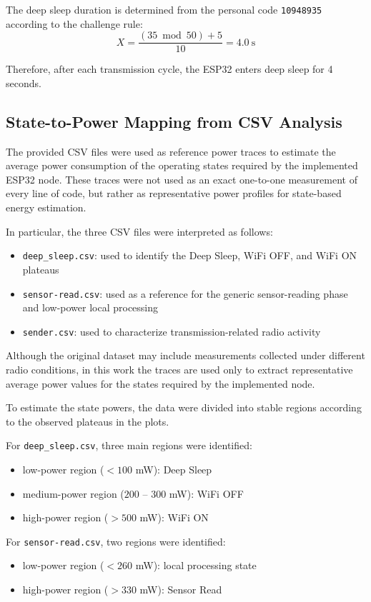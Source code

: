 \documentclass{article}
\begin{document}
The deep sleep duration is determined from the personal code \texttt{10948935} according to the challenge rule:
\[
X=\frac{(35 \bmod 50)+5}{10}=4.0\ \text{s}
\]

Therefore, after each transmission cycle, the ESP32 enters deep sleep for 4 seconds.

\subsection{State-to-Power Mapping from CSV Analysis}

The provided CSV files were used as reference power traces to estimate the average power consumption of the operating states required by the implemented ESP32 node. These traces were not used as an exact one-to-one measurement of every line of code, but rather as representative power profiles for state-based energy estimation.

In particular, the three CSV files were interpreted as follows:
\begin{itemize}
    \item \texttt{deep\_sleep.csv}: used to identify the Deep Sleep, WiFi OFF, and WiFi ON plateaus
    \item \texttt{sensor-read.csv}: used as a reference for the generic sensor-reading phase and low-power local processing
    \item \texttt{sender.csv}: used to characterize transmission-related radio activity
\end{itemize}

Although the original dataset may include measurements collected under different radio conditions, in this work the traces are used only to extract representative average power values for the states required by the implemented node.

To estimate the state powers, the data were divided into stable regions according to the observed plateaus in the plots.

For \texttt{deep\_sleep.csv}, three main regions were identified:
\begin{itemize}
    \item low-power region (\(<100\) mW): Deep Sleep
    \item medium-power region (\(200\) -- \(300\) mW): WiFi OFF
    \item high-power region (\(>500\) mW): WiFi ON
\end{itemize}

For \texttt{sensor-read.csv}, two regions were identified:
\begin{itemize}
    \item low-power region (\(<260\) mW): local processing state
    \item high-power region (\(>330\) mW): Sensor Read
\end{itemize}
\end{document}
